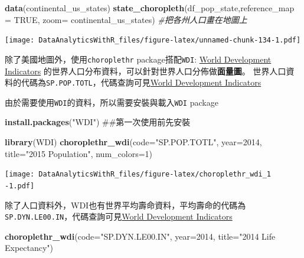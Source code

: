 \documentclass[]{book}
\newenvironment{Shaded}{\begin{snugshade}}{\end{snugshade}}
\newcommand{\KeywordTok}[1]{\textcolor[rgb]{0.13,0.29,0.53}{\textbf{{#1}}}}
\newcommand{\DataTypeTok}[1]{\textcolor[rgb]{0.13,0.29,0.53}{{#1}}}
\newcommand{\DecValTok}[1]{\textcolor[rgb]{0.00,0.00,0.81}{{#1}}}
\newcommand{\StringTok}[1]{\textcolor[rgb]{0.31,0.60,0.02}{{#1}}}
\newcommand{\CommentTok}[1]{\textcolor[rgb]{0.56,0.35,0.01}{\textit{{#1}}}}
\newcommand{\OtherTok}[1]{\textcolor[rgb]{0.56,0.35,0.01}{{#1}}}
\newcommand{\NormalTok}[1]{{#1}}
\theoremstyle{definition}
\theoremstyle{definition}
\theoremstyle{remark}
\begin{document}
\begin{Shaded}
\begin{Highlighting}[]
\KeywordTok{data}\NormalTok{(continental_us_states)}
\KeywordTok{state_choropleth}\NormalTok{(df_pop_state,}\DataTypeTok{reference_map =} \OtherTok{TRUE}\NormalTok{,}
                 \DataTypeTok{zoom=} \NormalTok{continental_us_states) }\CommentTok{#把各州人口畫在地圖上}
\end{Highlighting}
\end{Shaded}

\texttt{[image: DataAnalyticsWithR\_files/figure-latex/unnamed-chunk-134-1.pdf]}

除了美國地圖外，使用\texttt{choroplethr} package搭配\texttt{WDI}:
\href{http://beta.data.worldbank.org/}{World Development Indicators}
的世界人口分布資料，可以針對世界人口分佈做\textbf{面量圖}。
世界人口資料的代碼為\texttt{SP.POP.TOTL}，代碼查詢可見\href{http://beta.data.worldbank.org/}{World
Development Indicators}

由於需要使用\texttt{WDI}的資料，所以需要安裝與載入\texttt{WDI}\citep{R-WDI}
package

\begin{Shaded}
\begin{Highlighting}[]
\KeywordTok{install.packages}\NormalTok{(}\StringTok{"WDI"}\NormalTok{) ##第一次使用前先安裝}
\end{Highlighting}
\end{Shaded}

\begin{Shaded}
\begin{Highlighting}[]
\KeywordTok{library}\NormalTok{(WDI)}
\KeywordTok{choroplethr_wdi}\NormalTok{(}\DataTypeTok{code=}\StringTok{"SP.POP.TOTL"}\NormalTok{, }\DataTypeTok{year=}\DecValTok{2014}\NormalTok{, }
                \DataTypeTok{title=}\StringTok{"2015 Population"}\NormalTok{, }\DataTypeTok{num_colors=}\DecValTok{1}\NormalTok{)}
\end{Highlighting}
\end{Shaded}

\texttt{[image: DataAnalyticsWithR\_files/figure-latex/choroplethr\_wdi\_1 -1.pdf]}

除了人口資料外，WDI也有世界平均壽命資料，平均壽命的代碼為\texttt{SP.DYN.LE00.IN}，代碼查詢可見\href{http://beta.data.worldbank.org/}{World
Development Indicators}

\begin{Shaded}
\begin{Highlighting}[]
\KeywordTok{choroplethr_wdi}\NormalTok{(}\DataTypeTok{code=}\StringTok{"SP.DYN.LE00.IN"}\NormalTok{, }\DataTypeTok{year=}\DecValTok{2014}\NormalTok{, }
                \DataTypeTok{title=}\StringTok{"2014 Life Expectancy"}\NormalTok{)}
\end{Highlighting}
\end{Shaded}
\end{document}
